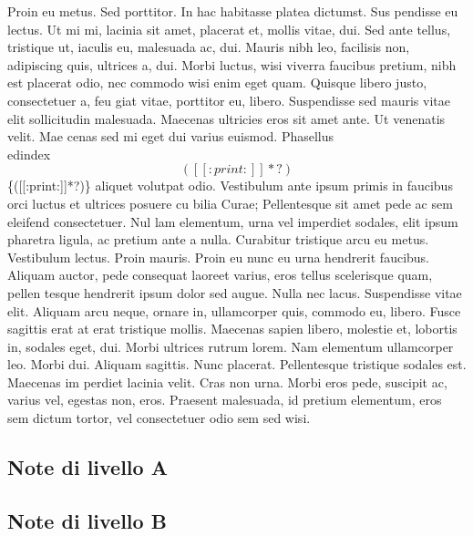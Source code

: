 \documentclass[10pt]{article}
\begin{document}
Proin eu metus. Sed porttitor. In hac habitasse platea dictumst. Sus
pendisse eu lectus. Ut mi mi, lacinia sit amet, placerat et, mollis vitae, dui.
Sed ante tellus, tristique ut, iaculis eu, malesuada ac, dui. Mauris nibh leo,
facilisis non, adipiscing quis, ultrices a, dui.
Morbi luctus, wisi viverra faucibus pretium, nibh est placerat odio, nec
commodo wisi enim eget quam. Quisque libero justo, consectetuer a, feu
giat vitae, porttitor eu, libero. Suspendisse sed mauris vitae elit sollicitudin
malesuada. Maecenas ultricies eros sit amet ante. Ut venenatis velit. Mae
cenas sed mi eget dui varius euismod. Phasellus\\edindex\[([[:print:]]*?)\]\{([[:print:]]*?)\} aliquet volutpat odio.
Vestibulum ante ipsum primis in faucibus orci luctus et ultrices posuere cu
bilia Curae; Pellentesque sit amet pede ac sem eleifend consectetuer. Nul
lam elementum, urna vel imperdiet sodales, elit ipsum pharetra ligula, ac
pretium ante  a nulla. Curabitur tristique arcu eu metus. Vestibulum
lectus. Proin mauris. Proin eu nunc eu urna hendrerit faucibus. Aliquam
auctor, pede consequat laoreet varius, eros tellus scelerisque quam, pellen
tesque hendrerit ipsum dolor sed augue. Nulla nec lacus.
Suspendisse vitae elit. Aliquam arcu neque, ornare in, ullamcorper quis,
commodo eu, libero. Fusce sagittis erat at erat tristique mollis. Maecenas
sapien libero, molestie et, lobortis in, sodales eget, dui. Morbi ultrices
rutrum lorem. Nam elementum ullamcorper leo. Morbi dui. Aliquam
sagittis. Nunc placerat. Pellentesque tristique sodales est. Maecenas im
perdiet lacinia velit. Cras non urna. Morbi eros pede, suscipit ac, varius
vel, egestas non, eros. Praesent malesuada,  id pretium elementum,
eros sem dictum tortor, vel consectetuer odio sem sed wisi.

\pend
\endnumbering
\clearpage
\subsection{Note di livello A}

\subsection{Note di livello B}
\end{document}
